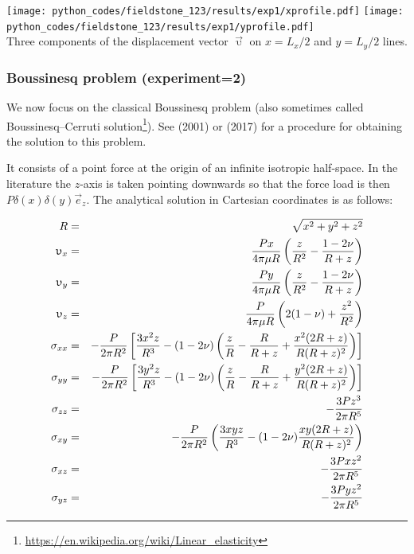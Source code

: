 \begin{center}
\texttt{[image: python\_codes/fieldstone\_123/results/exp1/xprofile.pdf]} 
\texttt{[image: python\_codes/fieldstone\_123/results/exp1/yprofile.pdf]} \\
{\captionfont Three components of the displacement vector $\vec{\upupsilon}$
on $x=L_x/2$ and $y=L_y/2$ lines.}
\end{center}


\subsubsection*{Boussinesq problem (experiment=2)}

We now focus on the classical Boussinesq problem (also sometimes called Boussinesq–Cerruti 
solution\footnote{\url{https://en.wikipedia.org/wiki/Linear_elasticity}}).
See \textcite{selv01} (2001) or \textcite{nwom17} (2017) 
for a procedure for obtaining the solution to this problem.

It consists of a point force at the origin of an infinite isotropic half-space. In the literature the 
$z$-axis is taken pointing downwards so that the force load is then $P\delta(x)\delta(y) \vec{e}_z$.
The analytical solution in Cartesian coordinates is as follows:

\begin{eqnarray}
R&=&\sqrt{x^2+y^2+z^2} \nonumber\\
\upupsilon_x &=& \frac{Px}{4\pi \mu R} 
\left(\frac{z}{R^2}-\frac{1-2\nu}{R+z}\right) \nonumber\\
\upupsilon_y &=& \frac{Py}{4\pi \mu R} 
\left(\frac{z}{R^2}-\frac{1-2\nu}{R+z}\right) \nonumber\\
\upupsilon_z &=& \frac{P}{4\pi \mu R} 
\left(2(1-\nu)+\frac{z^2}{R^2}\right) \nonumber\\
\sigma_{xx} &=& -\frac{P}{2\pi R^2}
\left[\frac{3x^2z}{R^3}-(1-2\nu)\left(\frac{z}{R}-\frac{R}{R+z} + \frac{x^2 (2R+z)}{R(R+z)^2}\right)
\right]\nonumber\\
\sigma_{yy} &=& -\frac{P}{2\pi R^2}
\left[\frac{3y^2z}{R^3}-(1-2\nu)\left(\frac{z}{R}-\frac{R}{R+z} + \frac{y^2 (2R+z)}{R(R+z)^2}\right)
\right]\nonumber\\
\sigma_{zz} &=& -\frac{3Pz^3}{2\pi R^5} \nonumber\\
\sigma_{xy} &=& -\frac{P}{2\pi R^2} 
\left(
\frac{3xyz}{R^3} - (1-2\nu) \frac{xy(2R+z)}{R(R+z)^2}
\right) \nonumber\\
\sigma_{xz} &=& -\frac{3Pxz^2}{2\pi R^5} \nonumber\\
\sigma_{yz} &=& -\frac{3Pyz^2}{2\pi R^5} \nonumber
\end{eqnarray}

